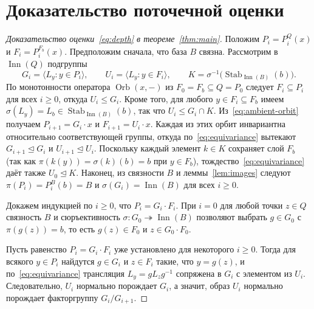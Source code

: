 \documentclass[11pt,a4paper]{article}
\theoremstyle{remark}
\newcommand{\Inn}{\operatorname{Inn}}
\newcommand{\Orb}{\operatorname{Orb}}
\newcommand{\Stab}{\operatorname{Stab}}
\begin{document}
\section{Доказательство поточечной оценки}\label{sec:quandles}

\begin{proof}[Доказательство оценки~\eqref{eq:depth} в теореме~\ref{thm:main}]
Положим \(P_i=P_i^Q(x)\) и \(F_i=P_i^{F_b}(x)\).
Предположим сначала, что база \(B\) связна. Рассмотрим в \(\Inn(Q)\)
подгруппы
\[
  G_i=\langle L_y : y\in P_i\rangle,\qquad
  U_i=\langle L_y : y\in F_i\rangle,\qquad
  K=\sigma^{-1}\bigl(\Stab_{\Inn(B)}(b)\bigr).
\]
По монотонности оператора \(\Orb(x,-)\) из \(F_0=F_b\subseteq Q=P_0\)
следует \(F_i\subseteq P_i\) для всех \(i\ge 0\), откуда \(U_i\le G_i\).
Кроме того, для любого \(y\in F_i\subseteq F_b\) имеем
\(\sigma(L_y)=L_b\in\Stab_{\Inn(B)}(b)\), так что \(U_i\le G_i\cap K\).
Из~\eqref{eq:ambient-orbit} получаем \(P_{i+1}=G_i\cdot x\) и
\(F_{i+1}=U_i\cdot x\). Каждая из этих орбит инвариантна относительно
соответствующей группы, откуда по~\eqref{eq:equivariance} вытекают
\(G_{i+1}\trianglelefteq G_i\) и \(U_{i+1}\trianglelefteq U_i\).
Поскольку каждый элемент \(k\in K\) сохраняет слой \(F_b\) (так как
\(\pi(k(y))=\sigma(k)(b)=b\) при \(y\in F_b\)), тождество~\eqref{eq:equivariance}
даёт также \(U_0\trianglelefteq K\). Наконец, из связности \(B\) и
леммы~\ref{lem:images} следуют \(\pi(P_i)=P_i^B(b)=B\) и
\(\sigma(G_i)=\Inn(B)\) для всех \(i\ge 0\).

Докажем индукцией по \(i\ge 0\), что \(P_i=G_i\cdot F_i\). При \(i=0\)
для любой точки \(z\in Q\) связность \(B\) и сюръективность
\(\sigma\colon G_0\twoheadrightarrow\Inn(B)\) позволяют выбрать
\(g\in G_0\) с \(\pi(g(z))=b\), то есть \(g(z)\in F_0\) и
\(z\in G_0\cdot F_0\).

Пусть равенство \(P_i=G_i\cdot F_i\) уже установлено для некоторого
\(i\ge 0\). Тогда для всякого \(y\in P_i\) найдутся \(g\in G_i\) и
\(z\in F_i\) такие, что \(y=g(z)\), и по~\eqref{eq:equivariance}
трансляция \(L_y=gL_zg^{-1}\) сопряжена в \(G_i\) с элементом из \(U_i\).
Следовательно, \(U_i\) нормально порождает \(G_i\), а значит, образ
\(U_i\) нормально порождает факторгруппу \(G_i/G_{i+1}\).


\end{proof}
\end{document}
